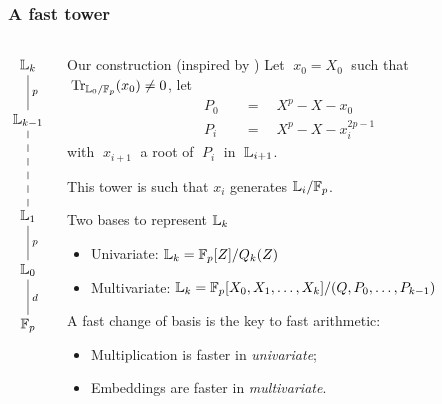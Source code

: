\documentclass[10pt,usepdftitle=false]{beamer}
\begin{document}
\begin{frame}
  \frametitle{A fast tower}

  \vspace{-2mm}

  \begin{columns}
    \begin{column}{0.1\textwidth}
      \Large\[\xymatrix{
        \LK_k \ar@{-}[d]^p\\
        \LK_{k-1} \ar@{--}[dd]\\
        \\
        \LK_1 \ar@{-}[d]^p\\
        \LK_0 \ar@{-}[d]^d\\
        \F_p
      }\]
    \end{column}
    \begin{column}{0.85\textwidth}
      \begin{block}{Our construction (inspired by \cite{cantor89})}
        Let $\;x_0 = X_0\;$ such that
        $\;\operatorname{Tr}_{\mathbb{L}_0/\mathbb{F}_p}(x_0) \ne 0$, let
        \begin{align*}
          P_0 \quad&=\quad X^p - X - x_0\\
          P_i \quad&=\quad X^p - X - x_i^{2p-1}
        \end{align*}
        with $\;x_{i+1}\;$ a root of $\;P_i\;$ in $\;\mathbb{L}_{i+1}$.

        \alert{This tower is such that $x_i$ generates $\mathbb{L}_i/\mathbb{F}_p$.}
      \end{block}

      \begin{block}{Two bases to represent $\mathbb{L}_k$}
        \begin{itemize}
        \item Univariate: \hfill\emph{$\mathbb{L}_k=\mathbb{F}_p[Z]/Q_k(Z)$}\hfill
        \item Multivariate: \hfill\emph{$\mathbb{L}_k=\mathbb{F}_p[X_0,X_1,\ldots,X_k]/(Q,P_0,\ldots,P_{k-1})$}\hfill
        \end{itemize}
        \alert{A fast change of basis is the key to fast arithmetic:}
        \begin{itemize}
        \item Multiplication is faster in \emph{univariate};
        \item Embeddings are faster in \emph{multivariate}.
        \end{itemize}
      \end{block}
    \end{column}
  \end{columns}
\end{frame}
\end{document}
